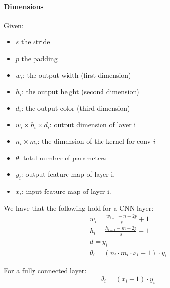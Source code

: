\paragraph{Dimensions}
Given:
\begin{itemize}
\item $s$ the stride 
\item $p$ the padding
\item $w_i$: the output width (first dimension)
\item $h_i$: the output height (second dimension)
\item $d_i$: the output color (third dimension)
\item $w_i\times h_i\times d_i$: output dimension of layer i
\item $n_i\times m_i$: the dimension of the kernel for conv $i$
\item $\theta$: total number of parameters
\item $y_i$: output feature map of layer i.
\item $x_i$: input feature map of layer i.
\end{itemize}

We have that the following hold for a CNN layer:
\begin{equation}
\begin{aligned}
w_i=\frac{w_{i-1}-n+2p}{s}+1\\
h_i=\frac{h_{i-1}-m+2p}{s}+1\\
d=y_i\\
\theta_i=(n_i\cdot m_i \cdot x_i+1)\cdot  y_i 
\end{aligned}
\end{equation}

For a fully connected layer:
$$\theta_i=(x_i +1)\cdot y_i $$

